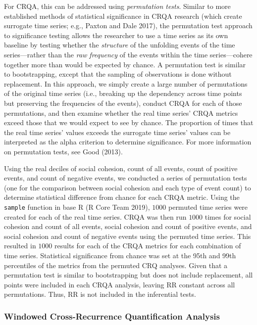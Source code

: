 \documentclass[english,man]{apa6}
\begin{document}
For CRQA, this can be addressed using \emph{permutation tests}. Similar to more
established methods of statistical significance in CRQA research (which create
surrogate time series; e.g., Paxton and Dale 2017), the permutation test
approach to significance testing allows the researcher to use a time series as
its own baseline by testing whether the \emph{structure} of the unfolding events of
the time series---rather than the \emph{raw frequency} of the events within the time
series---cohere together more than would be expected by chance. A permutation
test is similar to bootstrapping, except that the sampling of observations is
done without replacement. In this approach, we simply create a large number of
permutations of the original time series (i.e., breaking up the dependency
across time points but preserving the frequencies of the events), conduct CRQA
for each of those permutations, and then examine whether the real time series'
CRQA metrics exceed those that we would expect to see by chance. The proportion
of times that the real time series' values exceeds the surrogate time series'
values can be interpreted as the alpha criterion to determine significance. For
more information on permutation tests, see Good (2013).

Using the real deciles of social cohesion, count of all events, count of
positive events, and count of negative events, we conducted a series of
permutation tests (one for the comparison between social cohesion and each type
of event count) to determine statistical difference from chance for each CRQA
metric. Using the \texttt{sample} function in base R (R Core Team 2019), \(1000\) permuted time
series were created for each of the real time series. CRQA was then run \(1000\)
times for social cohesion and count of all events, social cohesion and count of
positive events, and social cohesion and count of negative events using the
permuted time series. This resulted in \(1000\) results for each of the CRQA
metrics for each combination of time series. Statistical significance from
chance was set at the 95th and 99th percentiles of the metrics from the permuted
CRQ analyses. Given that a permutation test is similar to bootstrapping but does
not include replacement, all points were included in each CRQA analysis, leaving
RR constant across all permutations. Thus, RR is not included in the inferential
tests.

\hypertarget{windowed-cross-recurrence-quantification-analysis}{%
\subsubsection{Windowed Cross-Recurrence Quantification Analysis}\label{windowed-cross-recurrence-quantification-analysis}}
\end{document}
